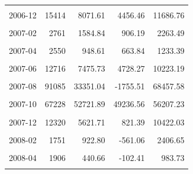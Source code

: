 \begin{longtable}[t]{crrrr}
\cellcolor{gray!10}{2006-11} & \cellcolor{gray!10}{29302} & \cellcolor{gray!10}{18151.22} & \cellcolor{gray!10}{7049.26} & \cellcolor{gray!10}{29253.18}\\
2006-12 & 15414 & 8071.61 & 4456.46 & 11686.76\\
\cellcolor{gray!10}{2007-01} & \cellcolor{gray!10}{4220} & \cellcolor{gray!10}{1947.52} & \cellcolor{gray!10}{1088.47} & \cellcolor{gray!10}{2806.57}\\
2007-02 & 2761 & 1584.84 & 906.19 & 2263.49\\
\cellcolor{gray!10}{2007-03} & \cellcolor{gray!10}{3340} & \cellcolor{gray!10}{2524.53} & \cellcolor{gray!10}{1897.50} & \cellcolor{gray!10}{3151.57}\\
2007-04 & 2550 & 948.61 & 663.84 & 1233.39\\
\cellcolor{gray!10}{2007-05} & \cellcolor{gray!10}{5123} & \cellcolor{gray!10}{2625.04} & \cellcolor{gray!10}{2026.34} & \cellcolor{gray!10}{3223.74}\\
2007-06 & 12716 & 7475.73 & 4728.27 & 10223.19\\
\cellcolor{gray!10}{2007-07} & \cellcolor{gray!10}{19931} & \cellcolor{gray!10}{9665.93} & \cellcolor{gray!10}{5616.95} & \cellcolor{gray!10}{13714.90}\\
2007-08 & 91085 & 33351.04 & -1755.51 & 68457.58\\
\cellcolor{gray!10}{2007-09} & \cellcolor{gray!10}{141220} & \cellcolor{gray!10}{84817.76} & \cellcolor{gray!10}{55680.99} & \cellcolor{gray!10}{113954.54}\\
2007-10 & 67228 & 52721.89 & 49236.56 & 56207.23\\
\cellcolor{gray!10}{2007-11} & \cellcolor{gray!10}{31421} & \cellcolor{gray!10}{19996.23} & \cellcolor{gray!10}{10745.58} & \cellcolor{gray!10}{29246.89}\\
2007-12 & 12320 & 5621.71 & 821.39 & 10422.03\\
\cellcolor{gray!10}{2008-01} & \cellcolor{gray!10}{2777} & \cellcolor{gray!10}{954.39} & \cellcolor{gray!10}{-478.84} & \cellcolor{gray!10}{2387.61}\\
2008-02 & 1751 & 922.80 & -561.06 & 2406.65\\
\cellcolor{gray!10}{2008-03} & \cellcolor{gray!10}{1887} & \cellcolor{gray!10}{48.88} & \cellcolor{gray!10}{-1189.11} & \cellcolor{gray!10}{1286.87}\\
2008-04 & 1906 & 440.66 & -102.41 & 983.73\\
\cellcolor{gray!10}{2008-05} & \cellcolor{gray!10}{2951} & \cellcolor{gray!10}{336.47} & \cellcolor{gray!10}{-1350.39} & \cellcolor{gray!10}{2023.33}\\

\end{longtable}
